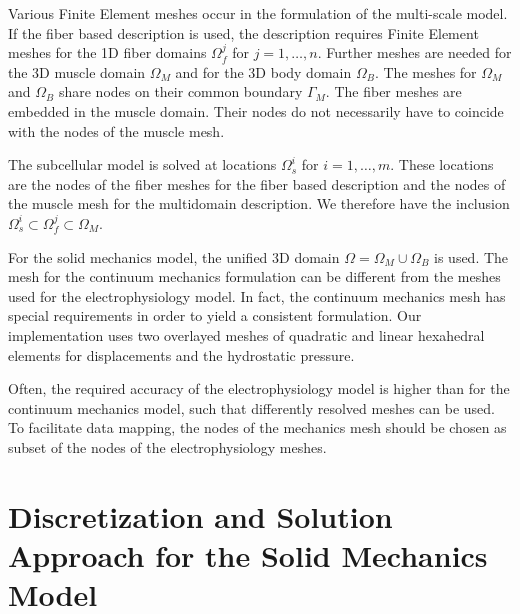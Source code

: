 Various Finite Element meshes occur in the formulation of the multi-scale model.
If the fiber based description is used, the description requires Finite Element meshes for the 1D fiber domains $\Omega_f^j$ for ${j=1,\dots,n}$. Further meshes are needed for the 3D muscle domain $\Omega_M$ and for the 3D body domain $\Omega_B$. The meshes for $\Omega_M$ and $\Omega_B$ share nodes on their common boundary $\Gamma_M$. The fiber meshes are embedded in the muscle domain. Their nodes do not necessarily have to coincide with the nodes of the muscle mesh.

The subcellular model is solved at locations $\Omega_s^i$ for $i=1,\dots,m$. These locations are the nodes of the fiber meshes for the fiber based description and the nodes of the muscle mesh for the multidomain description. We therefore have the inclusion $\Omega_s^i \subset \Omega_f^j \subset \Omega_M$.

For the solid mechanics model, the unified 3D domain $\Omega = \Omega_M \cup \Omega_B$ is used. The mesh for the continuum mechanics formulation can be different from the meshes used for the electrophysiology model. In fact, the continuum mechanics mesh has special requirements in order to yield a consistent formulation. Our implementation uses two overlayed meshes of quadratic and linear hexahedral elements for displacements and the hydrostatic pressure. 

Often, the required accuracy of the electrophysiology model is higher than for the continuum mechanics model, such that differently resolved meshes can be used. To facilitate data mapping, the nodes of the mechanics mesh should be chosen as subset of the nodes of the electrophysiology meshes.



\section{Discretization and Solution Approach for the Solid Mechanics Model }\label{sec:discretization_mechanics}

